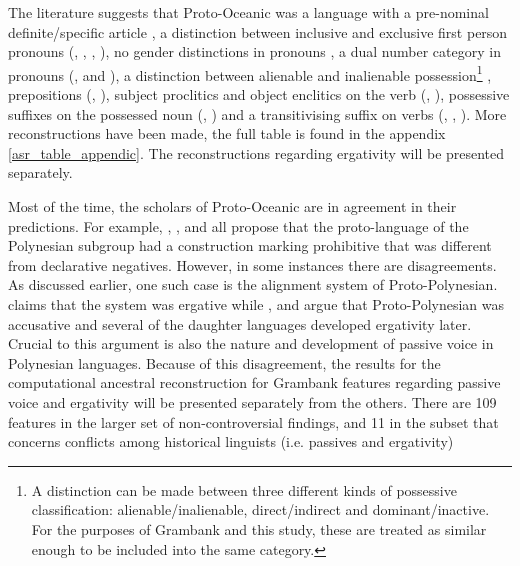 \documentclass[a4paper,10pt]{article} %
\begin{document}

The literature suggests that Proto-Oceanic was a language with a pre-nominal definite/specific article \citep[136]{crowley1985common}, a distinction between inclusive and exclusive first person pronouns (\citet[112]{pawley1973some}, \citet[184]{crowley1985common}, \citet[500]{ross2004morphosyntactic}, \citet[67, 75]{lynchrosscrowley_proto_grammar_oceanic}), no gender distinctions in pronouns \citep[498]{ross2004morphosyntactic}, a dual number category in pronouns (\citet[498]{ross2004morphosyntactic}, \citet[69]{lynchrosscrowley_proto_grammar_oceanic} and \citet[173]{pawley1973some}), a distinction between alienable and inalienable possession\footnote{A distinction can be made between three different kinds of possessive classification: alienable/inalienable, direct/indirect and dominant/inactive. For the purposes of Grambank and this study, these are treated as similar enough to be included into the same category.} \citep[69]{lynchrosscrowley_proto_grammar_oceanic}, prepositions (\citet[167]{pawley1973some}, \citet[498]{ross2004morphosyntactic}), subject proclitics and object enclitics on the verb (\citet[498-499]{ross2004morphosyntactic}, \citet[83]{lynchrosscrowley_proto_grammar_oceanic}), possessive suffixes on the possessed noun (\citet[495]{ross2004morphosyntactic}, \citet[155]{pawley1973some}) and a transitivising suffix on verbs (\citet[352]{pawley1970change}, \citet[171]{pawley1973some}, \citet[80, 92]{lynchrosscrowley_proto_grammar_oceanic}). More reconstructions have been made, the full table is found in the appendix \ref{asr_table_appendic}. The reconstructions regarding ergativity will be presented separately.

Most of the time, the scholars of Proto-Oceanic are in agreement in their predictions. For example, \citet[142]{pawley1973some}, \citet[292]{ross2007two}, \citet[xiii, 125]{clark1976aspects} and \citet[89]{lynchrosscrowley_proto_grammar_oceanic} all propose that the proto-language of the Polynesian subgroup had a construction marking prohibitive that was different from declarative negatives. However, in some instances there are disagreements. As discussed earlier, one such case is the alignment system of Proto-Polynesian. \citet{clark1976aspects} claims that the system was ergative while \citet{hale_1968}, \citet{hohepa_1967,hohepa_1969} and \citet{chung1978} argue that Proto-Polynesian was accusative and several of the daughter languages developed ergativity later. Crucial to this argument is also the nature and development of passive voice in Polynesian languages. Because of this disagreement, the results for the computational ancestral reconstruction for Grambank features regarding passive voice and ergativity will be presented separately from the others. There are 109 features in the larger set of non-controversial findings, and 11 in the subset that concerns conflicts among historical linguists (i.e. passives and ergativity)
\end{document}

